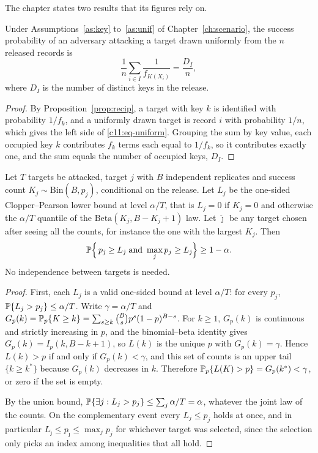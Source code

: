 The chapter states two results that its figures rely on.

\begin{proposition}\label{c11:prop-uniform}
Under Assumptions~\ref{as:key} to~\ref{as:unif} of Chapter~\ref{ch:scenario}, the
success probability of an adversary attacking a target drawn uniformly from the $n$
released records is
\begin{equation}\label{c11:eq-uniform}
\frac{1}{n}\sum_{i \in I}\frac{1}{f_{K(X_i)}} = \frac{D_I}{n},
\end{equation}
where $D_I$ is the number of distinct keys in the release.
\end{proposition}

\begin{proof}
By Proposition~\ref{prop:recip}, a target with key $k$ is identified with probability
$1/f_k$, and a uniformly drawn target is record $i$ with probability $1/n$, which
gives the left side of \eqref{c11:eq-uniform}. Grouping the sum by key value, each
occupied key $k$ contributes $f_k$ terms each equal to $1/f_k$, so it contributes
exactly one, and the sum equals the number of occupied keys, $D_I$.
\end{proof}

\begin{proposition}\label{c11:prop-worst}
Let $T$ targets be attacked, target $j$ with $B$ independent replicates and success
count $K_j \sim \mathrm{Bin}(B, p_j)$, conditional on the release. Let $L_j$ be the
one-sided Clopper--Pearson lower bound at level $\alpha/T$, that is $L_j = 0$ if
$K_j = 0$ and otherwise the $\alpha/T$ quantile of the $\mathrm{Beta}(K_j, B-K_j+1)$
law. Let $\hat\jmath$ be any target chosen after seeing all the counts, for instance
the one with the largest $K_j$. Then
\[
\mathbb{P}\Bigl\{\, p_{\hat\jmath} \ge L_{\hat\jmath}\ \text{and}\ \max_j p_j \ge L_{\hat\jmath} \Bigr\} \ge 1 - \alpha .
\]
No independence between targets is needed.
\end{proposition}

\begin{proof}
First, each $L_j$ is a valid one-sided bound at level $\alpha/T$: for every $p_j$,
$\mathbb{P}\{L_j > p_j\} \le \alpha/T$. Write $\gamma = \alpha/T$ and
$G_p(k) = \mathbb{P}_p\{K \ge k\} = \sum_{s \ge k}\binom{B}{s}p^s(1-p)^{B-s}$. For
$k \ge 1$, $G_p(k)$ is continuous and strictly increasing in $p$, and the
binomial--beta identity gives $G_p(k) = I_p(k, B-k+1)$, so $L(k)$ is the unique $p$
with $G_p(k) = \gamma$. Hence $L(k) > p$ if and only if $G_p(k) < \gamma$, and this
set of counts is an upper tail $\{k \ge k^\ast\}$ because $G_p(k)$ decreases in $k$.
Therefore $\mathbb{P}_p\{L(K) > p\} = G_p(k^\ast) < \gamma$, or zero if the set is empty.

By the union bound,
$\mathbb{P}\{\exists j: L_j > p_j\} \le \sum_j \alpha/T = \alpha$, whatever the joint law
of the counts. On the complementary event every $L_j \le p_j$ holds at once, and in
particular $L_{\hat\jmath} \le p_{\hat\jmath} \le \max_j p_j$ for whichever target
was selected, since the selection only picks an index among inequalities that all
hold.
\end{proof}

